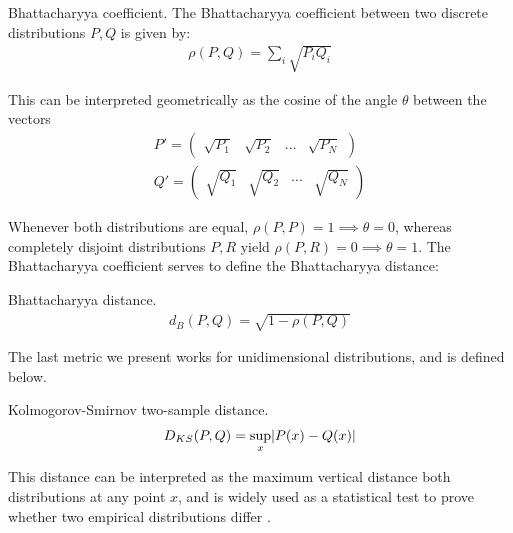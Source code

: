 \documentclass[../main.tex]{subfiles} \label{chapter_soa}
\begin{document}
\begin{definition}{Bhattacharyya coefficient.} \label{def_bhattacharyyacoef}
The Bhattacharyya coefficient between two discrete distributions $P, Q$ is given by:
\begin{align*}
\rho(P, Q) = \sum_i{\sqrt{P_iQ_i}}
\end{align*}
\par This can be interpreted geometrically as the cosine of the angle $\theta$ between the vectors \begin{align*}
P' = \begin{pmatrix}\sqrt{P_1}&\sqrt{P_2}&...&\sqrt{P_N}\end{pmatrix}\\
Q' = \begin{pmatrix}\sqrt{Q_1}&\sqrt{Q_2}&...&\sqrt{Q_N}\end{pmatrix}
\end{align*}
\end{definition}
\par Whenever both distributions are equal, $\rho(P, P) = 1 \implies \theta = 0$, whereas completely disjoint distributions $P, R$ yield $\rho(P, R) = 0 \implies \theta = 1$. The Bhattacharyya coefficient serves to define the Bhattacharyya distance:
\begin{definition}{Bhattacharyya distance.} \label{def_bhattacharyya}
\begin{align*}
d_B(P, Q) = \sqrt{1 - \rho(P, Q)}
\end{align*}
\end{definition}

\par The last metric we present works for unidimensional distributions, and is defined below.
\begin{definition}{Kolmogorov-Smirnov two-sample distance.} \label{def_ks2s}
\begin{align*}
D_{KS}(P, Q) = \sup_{x}\lvert P(x)-Q(x)\rvert
\end{align*}
\end{definition}
\par This distance can be interpreted as the maximum vertical distance both distributions at any point $x$, and is widely used as a statistical test to prove whether two empirical distributions differ \cite{KSMathworks2015}.
\end{document}
